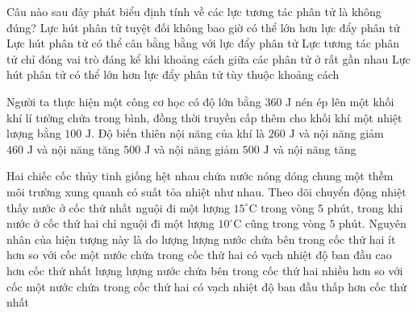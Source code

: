 \begin{ex}	Câu nào sau đây phát biểu định tính về các lực tương tác phân tử là không đúng?
	\choice
	{\True Lực hút phân tử tuyệt đối không bao giờ có thể lớn hơn lực đẩy phân tử}
	{Lực hút phân tử có thể cân bằng bằng với lực đẩy phân tử}
	{Lực tương tác phân tử chỉ đóng vai trò đáng kể khi khoảng cách giữa các phân tử ở rất gần nhau}
	{Lực hút phân tử có thể lớn hơn lực đẩy phân tử tùy thuộc khoảng cách}
\end{ex}

\begin{ex}	Người ta thực hiện một công cơ học có độ lớn bằng $360\text{ J}$ nén ép lên một khối khí lí tưởng chứa trong bình, đồng thời truyền cấp thêm cho khối khí một nhiệt lượng bằng $100\text{ J}$. Độ biến thiên nội năng của khí là
	\choice
	{$260\text{ J}$ và nội năng giảm}
	{\True $460\text{ J}$ và nội năng tăng}
	{$500\text{ J}$ và nội năng giảm}
	{$500\text{ J}$ và nội năng tăng}
\end{ex}

\begin{ex}	Hai chiếc cốc thủy tinh giống hệt nhau chứa nước nóng dóng chung một thềm môi trường xung quanh có suất tỏa nhiệt như nhau. Theo dõi chuyển động nhiệt thấy nước ở cốc thứ nhất nguội đi một lượng $15^\circ\text{C}$ trong vòng $5\text{ phút}$, trong khi nước ở cốc thứ hai chỉ nguội đi một lượng $10^\circ\text{C}$ cũng trong vòng $5\text{ phút}$. Nguyên nhân của hiện tượng này là do
	\choice
	{lượng lượng nước chứa bên trong cốc thứ hai ít hơn so với cốc một}
	{nước chứa trong cốc thứ hai có vạch nhiệt độ ban đầu cao hơn cốc thứ nhất}
	{lượng lượng nước chứa bên trong cốc thứ hai nhiều hơn so với cốc một}
	{\True nước chứa trong cốc thứ hai có vạch nhiệt độ ban đầu thấp hơn cốc thứ nhất}
\end{ex}

